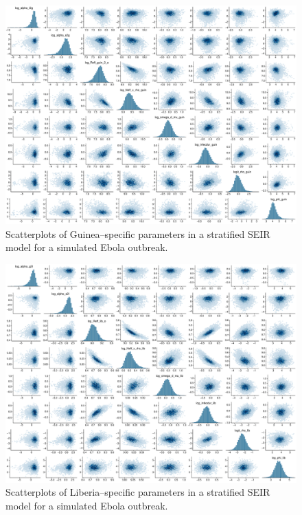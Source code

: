 \begin{figure}[htbp]
	\centering
	\includegraphics[width=\linewidth]{figures/ebola_synth_pairs_guin}
	\caption{Scatterplots of Guinea--specific parameters in a stratified SEIR model for a simulated Ebola outbreak.}
\end{figure}

\begin{figure}[htbp]
	\centering
	\includegraphics[width=\linewidth]{figures/ebola_synth_pairs_lib}
	\caption{Scatterplots of Liberia--specific parameters in a stratified SEIR model for a simulated Ebola outbreak.}
\end{figure}


